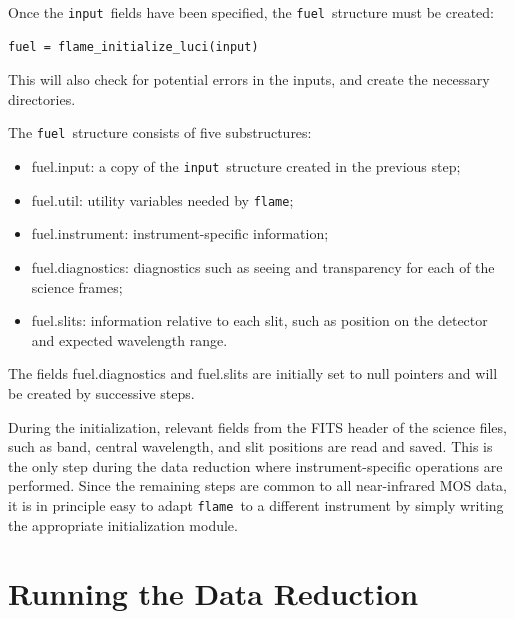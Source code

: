 \documentclass[a4paper, notitlepage]{article}
\newcommand{\flame}{\texttt{flame}}
\newcommand{\fuel}{\texttt{fuel}}
\newcommand{\inp}{\texttt{input}}
\begin{document}
Once the \inp\ fields have been specified, the \fuel\ structure must be created:
\begin{lstlisting}
fuel = flame_initialize_luci(input)
\end{lstlisting}
This will also check for potential errors in the inputs, and create the necessary directories.

The \fuel\ structure consists of five substructures:
\begin{itemize}
	\item fuel.input: a copy of the \inp\ structure created in the previous step;
	\item fuel.util: utility variables needed by \flame;
	\item fuel.instrument: instrument-specific information;
	\item fuel.diagnostics: diagnostics such as seeing and transparency for each of the science frames;
	\item fuel.slits: information relative to each slit, such as position on the detector and expected wavelength range.
\end{itemize}

The fields fuel.diagnostics and fuel.slits are initially set to null pointers and will be created by successive steps.

During the initialization, relevant fields from the FITS header of the science files, such as band, central wavelength, and slit positions are read and saved. This is the only step during the data reduction where instrument-specific operations are performed. Since the remaining steps are common to all near-infrared MOS data, it is in principle easy to adapt \flame\ to a different instrument by simply writing the appropriate initialization module.








\section{Running the Data Reduction}
\end{document}

